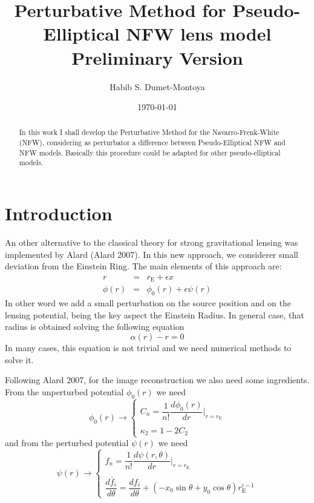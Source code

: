 \documentclass[a4paper,twoside,prd]{revtex4}
\def \re {r_{\mathrm{E}}}
\def \po {\phi_0}
\def \al {\alpha}
\def \te {\theta}
\begin{document}
\title{Perturbative Method for Pseudo-Elliptical NFW lens model\\ Preliminary Version}
%
\author{Habib S. Dumet-Montoya}
\begin{abstract}
In this work I shall develop the Perturbative Method  for the Navarro-Frenk-White (NFW), considering as perturbator a difference between Pseudo-Elliptical NFW and NFW models. Basically this procedure could be adapted for other pseudo-elliptical models.
\end{abstract}

\date{\today}
\maketitle

\section{Introduction}
An other alternative to the classical theory for strong gravitational lensing was implemented by Alard (Alard 2007). In this new approach, we  considerer small deviation from the Einstein Ring. The main elements of this approach are:
\begin{eqnarray*}
r&=&\re +\epsilon x\\
\phi(r)&=&\po(r)+\epsilon\psi(r)
\end{eqnarray*}
In other word we add a small perturbation on the source position and on the lensing potential, being the key aspect the Einstein Radius.  
In  general case, that radius is obtained solving the following equation
\begin{equation}
\al(r)-r=0
\label{reeq}
\end{equation}
In many cases, this equation is not trivial and we need numerical methods to solve it.

Following Alard 2007, for the image reconstruction we also need some ingredients.
From the unperturbed potential $\po(r)$ we need
\begin{equation}
\po(r) \rightarrow \left\{
\begin{array}{l}
C_n=\dfrac{1}{n!}\dfrac{d\po(r)}{dr}{\Big|_{r=\re}}\\
\\
\kappa_2=1-2C_2 
\end{array}\right.
\label{nfwcis}
\end{equation}
and from the perturbed potential $\psi(r)$ we need
\begin{equation}
\psi(r) \rightarrow \left\{
\begin{array}{l}
f_n=\dfrac{1}{n!}\dfrac{d\psi(r,\te)}{dr}{\Big|_{r=\re}}\\
\\
\dfrac{d\bar{f}_i}{d\te}=\dfrac{d f_i}{d\te}+\left(-x_0\sin{\te}+y_0\cos{\te}\right)\re^{i-1}
\end{array}\right.
\label{nfwfis}
\end{equation}
\end{document}
